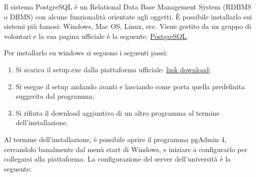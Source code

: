 \documentclass[a4paper]{article}
\begin{document}
	Il sistema PostgreSQL è un Relational Data Base Management System (RDBMS o DBMS) con alcune funzionalità orientate agli oggetti. È possibile installarlo sui sistemi più famosi: Windows, Mac OS, Linux, ecc. Viene gestito da un gruppo di volontari e la sua pagina ufficiale è la seguente: \href{https://www.postgresql.org/}{PostgreSQL}.\newline
	
	\noindent
	Per installarlo su windows si seguono i seguenti passi:
	\begin{enumerate}
		\item Si scarica il \textsf{setup.exe} dalla piattaforma ufficiale: \href{https://www.postgresql.org/download/}{link download};
		
		\item Si esegue il setup andando avanti e lasciando come porta quella predefinita suggerita dal programma;
		
		\item Si rifiuta il download aggiuntivo di un altro programma al termine dell'installazione.
	\end{enumerate}
	Al termine dell'installazione, è possibile aprire il programma pgAdmin 4, cercandolo banalmente dal menù start di Windows, e iniziare a configurarlo per collegarsi alla piattaforma. La configurazione del server dell'università è la seguente:
\end{document}

